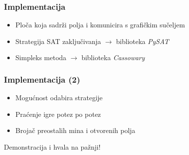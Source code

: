 \documentclass{beamer}
\begin{document}
        \begin{frame}[t]
        \frametitle{Implementacija}
        
         \begin{figure}
            \centering
        \end{figure}

      \begin{itemize}
            \item<2-> Ploča koja sadrži polja i komunicira s grafičkim sučeljem
            \item<3-> Strategija SAT zaključivanja $\rightarrow$ biblioteka \textit{PySAT}
            \item<4-> Simpleks metoda $\rightarrow$ biblioteka \textit{Cassowary}
        \end{itemize}
    \end{frame}
    
      \begin{frame}[t]
        \frametitle{Implementacija (2)}
        
         \begin{figure}
            \centering
        \end{figure}

      \begin{itemize}
            \item<2-> Mogućnost odabira strategije
            \item<3-> Praćenje igre potez po potez
            \item<4-> Brojač preostalih mina i otvorenih polja
        \end{itemize}
    \end{frame}

    \begin{frame}[standout]
        Demonstracija i hvala na pažnji!
    \end{frame}
\end{document}
